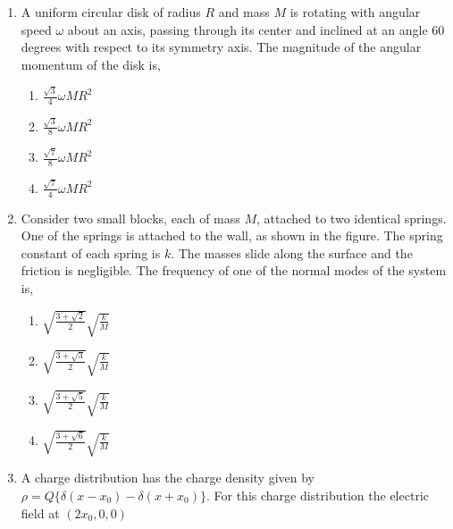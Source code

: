 \documentclass[journal]{IEEEtran}
\begin{document}
\begin{enumerate}
\begin{multicols}{4}
		\end{multicols}
  \item  A uniform circular disk of radius $R$ and mass $M$ is rotating with angular speed $\omega$ about an axis, passing through its center and inclined at an angle 60 degrees with respect to its symmetry axis. The magnitude of the angular momentum of the disk is,
  \begin{multicols}{4}
			\begin{enumerate}
\item $\frac{\sqrt{3}}{4} \omega M R^{2}$
\item $\frac{\sqrt{3}}{8} \omega M R^{2}$
\item $\frac{\sqrt{7}}{8} \omega M R^{2}$
\item $\frac{\sqrt{7}}{4} \omega M R^{2}$
\end{enumerate}
		\end{multicols}
  \item Consider two small blocks, each of mass $M$, attached to two identical springs. One of the springs is attached to the wall, as shown in the figure. The spring constant of each spring is $k$. The masses slide along the surface and the friction is negligible. The frequency of one of the normal modes of the system is,
  
   \begin{multicols}{4}
			\begin{enumerate}
  \item$\sqrt{\frac{3+\sqrt{2}}{2}} \sqrt{\frac{k}{M}}$
\item $\sqrt{\frac{3+\sqrt{3}}{2}} \sqrt{\frac{k}{M}}$
\item$\sqrt{\frac{3+\sqrt{5}}{2}} \sqrt{\frac{k}{M}}$
\item $\sqrt{\frac{3+\sqrt{6}}{2}} \sqrt{\frac{k}{M}}$
\end{enumerate}
		\end{multicols}
  
\item    A charge distribution has the charge density given by $\rho=Q\{\delta(x-x_{0})-\delta(x+x_{0})\}$. For this charge distribution the electric field at $(2 x_{0}, 0,0)$
\begin{multicols}{4}
			\begin{enumerate}


\end{enumerate}
\end{multicols}
\end{enumerate}
\end{document}
